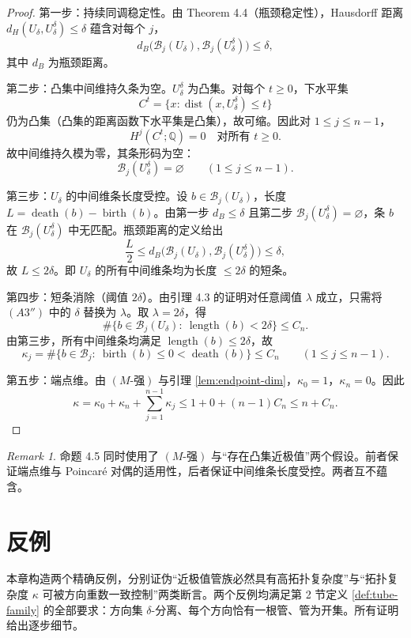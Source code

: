 \documentclass[11pt,a4paper]{article}
\theoremstyle{remark}
\newtheorem{remark}[theorem]{Remark}
\begin{document}
\begin{proof}
	第一步：持续同调稳定性。由 \cite{Chazal2009} Theorem 4.4（瓶颈稳定性），Hausdorff 距离 $d_H(U_\delta,U_\delta^\delta)\le\delta$ 蕴含对每个 $j$，
	\[
	d_B\bigl(\mathcal B_j(U_\delta),\mathcal B_j(U_\delta^\delta)\bigr)\le\delta,
	\]
	其中 $d_B$ 为瓶颈距离。
	
	第二步：凸集中间维持久条为空。$U_\delta^\delta$ 为凸集。对每个 $t\ge0$，下水平集
	\[
	C^t=\{x:\operatorname{dist}(x,U_\delta^\delta)\le t\}
	\]
	仍为凸集（凸集的距离函数下水平集是凸集），故可缩。因此对 $1\le j\le n-1$，
	\[
	H^j(C^t;\mathbb Q)=0\quad\text{对所有 }t\ge0.
	\]
	故中间维持久模为零，其条形码为空：
	\[
	\mathcal B_j(U_\delta^\delta)=\varnothing\qquad(1\le j\le n-1).
	\]
	
	第三步：$U_\delta$ 的中间维条长度受控。设 $b\in\mathcal B_j(U_\delta)$，长度
	$L=\operatorname{death}(b)-\operatorname{birth}(b)$。由第一步 $d_B\le\delta$
	且第二步 $\mathcal B_j(U_\delta^\delta)=\varnothing$，条 $b$ 在 $\mathcal B_j(U_\delta^\delta)$ 中无匹配。瓶颈距离的定义给出
	\[
	\frac{L}{2}\le d_B\bigl(\mathcal B_j(U_\delta),\mathcal B_j(U_\delta^\delta)\bigr)\le\delta,
	\]
	故 $L\le2\delta$。即 $U_\delta$ 的所有中间维条均为长度 $\le2\delta$ 的短条。
	
	第四步：短条消除（阈值 $2\delta$）。由引理 4.3 的证明对任意阈值 $\lambda$ 成立，只需将 $(A3'')$ 中的 $\delta$ 替换为 $\lambda$。取 $\lambda=2\delta$，得
	\[
	\#\bigl\{b\in\mathcal B_j(U_\delta):\ \operatorname{length}(b)<2\delta\bigr\}\le C_n.
	\]
	由第三步，所有中间维条均满足 $\operatorname{length}(b)\le2\delta$，故
	\[
	\kappa_j=\#\{b\in\mathcal B_j:\ \operatorname{birth}(b)\le0<\operatorname{death}(b)\}\le C_n
	\qquad(1\le j\le n-1).
	\]
	
	第五步：端点维。由 $(M‑强)$ 与引理 \ref{lem:endpoint-dim}，$\kappa_0=1$，$\kappa_n=0$。因此
	\[
	\kappa=\kappa_0+\kappa_n+\sum_{j=1}^{n-1}\kappa_j
	\le 1+0+(n-1)C_n
	\le n+C_n.
	\]
\end{proof}
		
		\begin{remark}
		命题 4.5 同时使用了 $(M‑强)$ 与“存在凸集近极值”两个假设。前者保证端点维与 Poincaré 对偶的适用性，后者保证中间维条长度受控。两者互不蕴含。
		\end{remark}
		
		\section{反例}
		本章构造两个精确反例，分别证伪“近极值管族必然具有高拓扑复杂度”与“拓扑复杂度 $\kappa$ 可被方向重数一致控制”两类断言。两个反例均满足第 2 节定义 \ref{def:tube-family} 的全部要求：方向集 $\delta$-分离、每个方向恰有一根管、管为开集。所有证明给出逐步细节。
		
\end{document}
